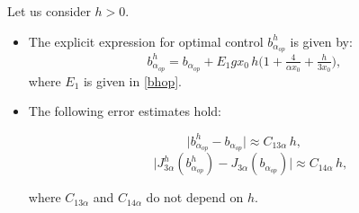 \documentclass[axioms,article,submit,moreauthors]{Definitions/mdpi}
\begin{document}
\begin{Lemma} Let us consider $h > 0$.
    
     \begin{itemize}
      \item[(a)]  The explicit expression for optimal control ${b^h_{\alpha_{op}}} $ is given by:     
     \begin{equation}\label{bhalphaop}
      {b^h_{\alpha_{op}}} =b_{\alpha_{op}} + E_1 g x_0 \,h \Big(1+\tfrac{4}{\alpha x_0}+ \tfrac{h}{3 x_0}\Big),
     \end{equation}
     where $E_1$ is given in \eqref{bhop}.
     \noindent 
     
      \item[(b)] The following error estimates hold:
  
     		\begin{equation}\label{bhalphaop-balphaop}  
     				      \lvert {b^h_{\alpha_{op}}} - b_{\alpha_{op}} \rvert \approx C_{13\alpha} \, h ,
     				      \end{equation}\label{J3halphabhalphaop-J3alphabalphaop}
     				      \begin{equation}     		\quad 		     \Big \lvert { J^h_{3\alpha}}({b^h_{\alpha_{op}}}) -  J_{3\alpha}(b_{\alpha_{op}}) \Big \rvert \approx C_{14\alpha} \, h,
     				      \end{equation}
    		
        where $C_{13\alpha}$  and $C_{14\alpha}$ do not depend on $h$.
     
     \end{itemize}
    
  \end{Lemma}
\end{document}
